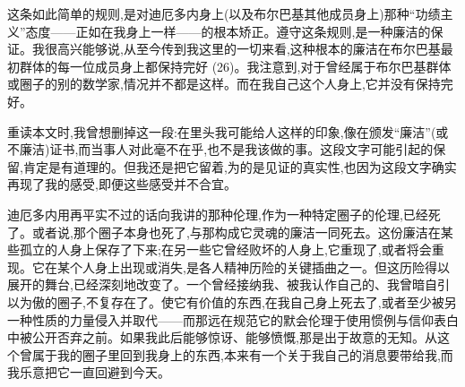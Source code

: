 这条如此简单的规则,是对迪厄多内身上(以及布尔巴基其他成员身上)那种“功绩主义”态度——正如在我身上一样——的根本矫正。遵守这条规则,是一种廉洁的保证。我很高兴能够说,从至今传到我这里的一切来看,这种根本的廉洁在布尔巴基最初群体的每一位成员身上都保持完好 (26)。我注意到,对于曾经属于布尔巴基群体或圈子的别的数学家,情况并不都是这样。而在我自己这个人身上,它并没有保持完好。\par{}重读本文时,我曾想删掉这一段:在里头我可能给人这样的印象,像在颁发“廉洁”(或不廉洁)证书,而当事人对此毫不在乎,也不是我该做的事。这段文字可能引起的保留,肯定是有道理的。但我还是把它留着,为的是见证的真实性,也因为这段文字确实再现了我的感受,即便这些感受并不合宜。

迪厄多内用再平实不过的话向我讲的那种伦理,作为一种特定圈子的伦理,已经死了。或者说,那个圈子本身也死了,与那构成它灵魂的廉洁一同死去。这份廉洁在某些孤立的人身上保存了下来;在另一些它曾经败坏的人身上,它重现了,或者将会重现。它在某个人身上出现或消失,是各人精神历险的关键插曲之一。但这历险得以展开的舞台,已经深刻地改变了。一个曾经接纳我、被我认作自己的、我曾暗自引以为傲的圈子,不复存在了。使它有价值的东西,在我自己身上死去了,或者至少被另一种性质的力量侵入并取代——而那远在规范它的默会伦理于使用惯例与信仰表白中被公开否弃之前。如果我此后能够惊讶、能够愤慨,那是出于故意的无知。从这个曾属于我的圈子里回到我身上的东西,本来有一个关于我自己的消息要带给我,而我乐意把它一直回避到今天。


